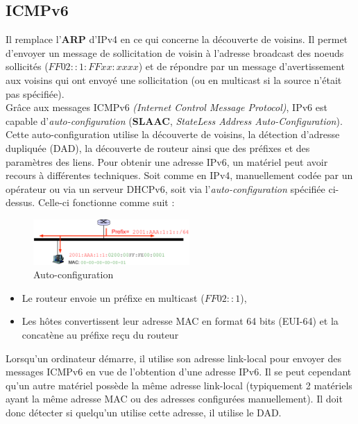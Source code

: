 \documentclass{article}
\newcommand{\term}[1]{\textit{\textcolor{maintitle}{#1}}}
\begin{document}
\begin{sffamily}
\subsection{ICMPv6}

Il remplace l'\textbf{ARP} d'IPv4 en ce qui concerne la découverte de voisins. Il permet d'envoyer un message de sollicitation 
de voisin à l'adresse broadcast des noeuds sollicités ($FF02::1:FFxx:xxxx$) et de répondre par un message d'avertissement aux 
voisins qui ont envoyé une sollicitation (ou en multicast si la source n'était pas spécifiée).\\

Grâce aux messages ICMPv6 \textit{(Internet Control Message Protocol)}, IPv6 est capable d'\term{auto-configuration} 
(\textbf{SLAAC}, \textit{StateLess Address Auto-Configuration}). Cette auto-configuration utilise la découverte de voisins, la 
détection d'adresse dupliquée (DAD), la découverte de routeur ainsi que des préfixes et des paramètres des liens. Pour obtenir 
une adresse IPv6, un matériel peut avoir recours à différentes techniques. Soit comme en IPv4, manuellement codée par un 
opérateur ou via un serveur DHCPv6, soit via l'\term{auto-configuration} spécifiée ci-dessus. Celle-ci fonctionne comme suit :
\begin{figure}[h!]
    \begin{center}
    \includegraphics[width=225px]{img_005.pdf}
    \caption{Auto-configuration}
    \end{center}	
\end{figure}
\begin{itemize}
\item Le routeur envoie un préfixe en multicast ($FF02::1$),
\item Les hôtes convertissent leur adresse MAC en format 64 bits (EUI-64) et la concatène au préfixe reçu du routeur
\end{itemize}

Lorsqu'un ordinateur démarre, il utilise son adresse link-local pour envoyer des messages ICMPv6 en vue de l'obtention d'une 
adresse IPv6. Il se peut cependant qu'un autre matériel possède la même adresse link-local (typiquement 2 matériels ayant la 
même adresse MAC ou des adresses configurées manuellement). Il doit donc détecter si quelqu'un utilise cette adresse, il 
utilise le DAD.


\end{sffamily}
\end{document}
